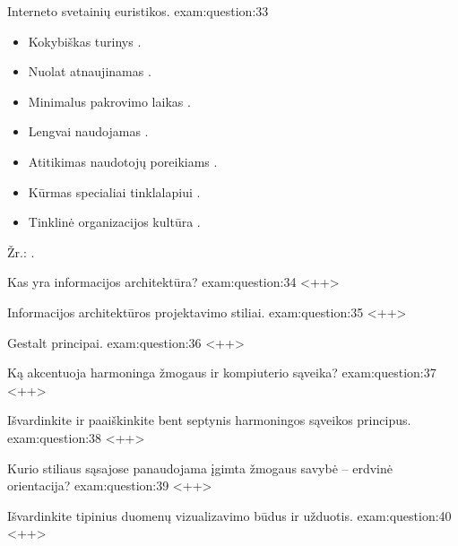 \begin{question}{%
  Interneto svetainių euristikos.
  }{exam:question:33}
  \begin{itemize}
    \item Kokybiškas turinys .
    \item Nuolat atnaujinamas .
    \item Minimalus pakrovimo laikas .
    \item Lengvai naudojamas .
    \item Atitikimas naudotojų poreikiams .
    \item Kūrmas specialiai tinklalapiui .
    \item Tinklinė organizacijos kultūra .
  \end{itemize}
  Žr.: \cite[37]{skaidres-13}.
\end{question}

\begin{question}{%
  Kas yra informacijos architektūra?
  }{exam:question:34}
  <++>
\end{question}

\begin{question}{%
  Informacijos architektūros projektavimo stiliai.
  }{exam:question:35}
  <++>
\end{question}

\begin{question}{%
  Gestalt principai.
  }{exam:question:36}
  <++>
\end{question}

\begin{question}{%
  Ką akcentuoja harmoninga žmogaus ir kompiuterio sąveika?
  }{exam:question:37}
  <++>
\end{question}

\begin{question}{%
  Išvardinkite ir paaiškinkite bent septynis harmoningos sąveikos
  principus.
  }{exam:question:38}
  <++>
\end{question}

\begin{question}{%
  Kurio stiliaus sąsajose panaudojama įgimta žmogaus savybė – erdvinė
  orientacija?
  }{exam:question:39}
  <++>
\end{question}

\begin{question}{%
  Išvardinkite tipinius duomenų vizualizavimo būdus ir užduotis.
  }{exam:question:40}
  <++>
\end{question}
